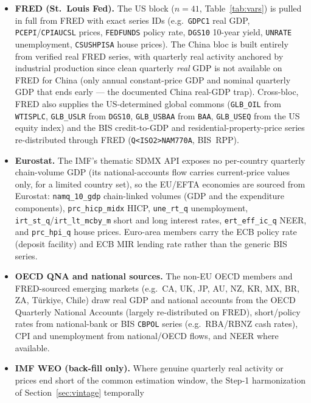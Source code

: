 \documentclass[11pt]{article}
\theoremstyle{definition}
\theoremstyle{remark}
\begin{document}
\begin{itemize}
  \item \textbf{FRED (St.\ Louis Fed).} The US block ($n=41$,
    Table~\ref{tab:vars}) is pulled in full from FRED with exact series
    IDs (e.g.\ \texttt{GDPC1} real GDP, \texttt{PCEPI}/\texttt{CPIAUCSL}
    prices, \texttt{FEDFUNDS} policy rate, \texttt{DGS10} 10-year yield,
    \texttt{UNRATE} unemployment, \texttt{CSUSHPISA} house prices). The
    China bloc is built entirely from verified real FRED series, with
    quarterly real activity anchored by industrial production since clean
    quarterly \emph{real} GDP is not available on FRED for China (only
    annual constant-price GDP and nominal quarterly GDP that ends early ---
    the documented China real-GDP trap). Cross-bloc, FRED also supplies
    the US-determined global commons (\texttt{GLB\_OIL} from
    \texttt{WTISPLC}, \texttt{GLB\_USLR} from \texttt{DGS10},
    \texttt{GLB\_USBAA} from \texttt{BAA}, \texttt{GLB\_USEQ} from the US
    equity index) and the BIS credit-to-GDP and residential-property-price
    series re-distributed through FRED (\texttt{Q<ISO2>NAM770A},
    BIS~RPP).
  \item \textbf{Eurostat.} The IMF's thematic SDMX API exposes no
    per-country quarterly chain-volume GDP (its national-accounts flow
    carries current-price values only, for a limited country set), so the
    EU/EFTA economies are sourced from Eurostat: \texttt{namq\_10\_gdp}
    chain-linked volumes (GDP and the expenditure components),
    \texttt{prc\_hicp\_midx} HICP, \texttt{une\_rt\_q} unemployment,
    \texttt{irt\_st\_q}/\texttt{irt\_lt\_mcby\_m} short and long interest
    rates, \texttt{ert\_eff\_ic\_q} NEER, and \texttt{prc\_hpi\_q} house
    prices. Euro-area members carry the ECB policy rate (deposit facility)
    and ECB MIR lending rate rather than the generic BIS series.
  \item \textbf{OECD QNA and national sources.} The non-EU OECD members
    and FRED-sourced emerging markets (e.g.\ CA, UK, JP, AU, NZ, KR, MX,
    BR, ZA, T\"urkiye, Chile) draw real GDP and national accounts from the
    OECD Quarterly National Accounts (largely re-distributed on FRED),
    short/policy rates from national-bank or BIS \texttt{CBPOL} series
    (e.g.\ RBA/RBNZ cash rates), CPI and unemployment from national/OECD
    flows, and NEER where available.
  \item \textbf{IMF WEO (back-fill only).} Where genuine quarterly real
    activity or prices end short of the common estimation window, the
    Step-1 harmonization of Section~\ref{sec:vintage} temporally

\end{itemize}
\end{document}
